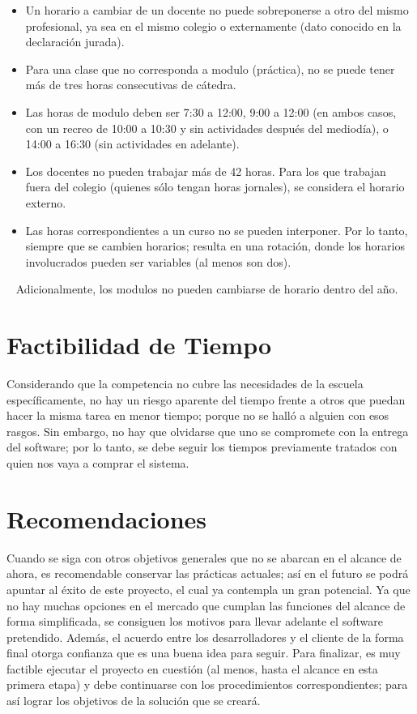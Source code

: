 \begin{itemize}
  \item Un horario a cambiar de un docente no puede
  sobreponerse a otro del mismo profesional, ya sea en
  el mismo colegio o externamente (dato conocido en la
  declaración jurada).
  \item Para una clase que no corresponda a \Gls{modulo}
  (práctica), no se puede tener más de tres horas
  consecutivas de cátedra.
  \item Las horas de \Gls{modulo} deben ser 7:30 a 12:00,
  9:00 a 12:00 (en ambos casos, con un recreo de 10:00
  a 10:30 y sin actividades después del mediodía), o
  14:00 a 16:30 (sin actividades en adelante).
  \item Los docentes no pueden trabajar más de 42 horas.
  Para los que trabajan fuera del colegio (quienes sólo
  tengan horas jornales), se considera el horario externo.
  \item Las horas correspondientes a un curso no se pueden
  interponer. Por lo tanto, siempre que se cambien horarios;
  resulta en una rotación, donde los horarios involucrados
  pueden ser variables (al menos son dos).
\end{itemize}
\ \newline
\normalsize{ \indent
Adicionalmente, los \Glspl{modulo} no pueden cambiarse de
horario dentro del año.
}
\section{Factibilidad de Tiempo}
\normalsize{ \indent
Considerando que la competencia no cubre las necesidades de
la escuela específicamente, no hay un riesgo aparente del
tiempo frente a otros que puedan hacer la misma tarea en
menor tiempo; porque no se halló a alguien con esos rasgos.
Sin embargo, no hay que olvidarse que uno se compromete con
la entrega del software; por lo tanto, se debe seguir los
tiempos previamente tratados con quien nos vaya a comprar el
sistema.
}
\section{Recomendaciones}
\normalsize{ \indent
Cuando se siga con otros objetivos generales que no se abarcan
en el alcance de ahora, es recomendable conservar las prácticas
actuales; así en el futuro se podrá apuntar al éxito de este
proyecto, el cual ya contempla un gran potencial.
}
\newline
\normalsize{ \indent
Ya que no hay muchas opciones en el mercado que cumplan las
funciones del alcance de forma simplificada, se consiguen los
motivos para llevar adelante el software pretendido. Además,
el acuerdo entre los desarrolladores y el cliente de la forma
final otorga confianza que es una buena idea para seguir.
}
\newline
\normalsize{ \indent
Para finalizar, es muy factible ejecutar el proyecto en
cuestión (al menos, hasta el alcance en esta primera etapa) y
debe continuarse con los procedimientos correspondientes; para
así lograr los objetivos de la solución que se creará.
}
